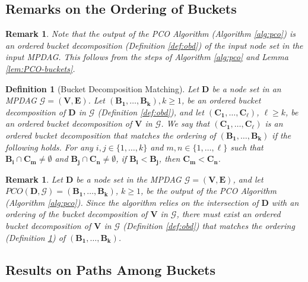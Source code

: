 \documentclass[11pt]{article}
\newtheorem{remark}[theorem]{Remark}
\newtheorem{definition}[theorem]{Definition}
\newcommand{\mb}[1]{\mathbf{#1}}
\newcommand{\g}[1][G]{\mathcal{#1}}
\begin{document}

\subsection{Remarks on the Ordering of Buckets}

\begin{remark} 
    Note that the output of the PCO Algorithm (Algorithm \ref{alg:pco}) is an ordered bucket decomposition (Definition \ref{def:obd}) of the input node set in the input MPDAG. This follows from the steps of Algorithm \ref{alg:pco} and Lemma \ref{lem:PCO-buckets}.
\end{remark}


\begin{definition}[Bucket Decomposition Matching]
\label{def:obd-matching}
    Let $\mb{D}$ be a node set in an MPDAG $\g=(\mb{V},\mb{E})$. Let $(\mb{B_1}, \dots, \mb{B_k}), k \ge 1$, be an ordered bucket decomposition of $\mb{D}$ in $\g$ (Definition \ref{def:obd}), and let $(\mb{C_1}, \dots, \mb{C_{\ell}})$, $\ell \ge k$, be an ordered bucket decomposition of $\mb{V}$ in $\g$. We say that $(\mb{C_1}, \dots, \mb{C_{\ell}})$ is an ordered bucket decomposition that \emph{matches the ordering} of $(\mb{B_1}, \dots, \mb{B_k})$ if the following holds. For any $i,j \in \{1, \dots, k \}$ and $m, n \in \{ 1, \dots, \ell \}$ such that $\mb{B_i} \cap \mb{C_m} \neq \emptyset$ and $\mb{B_j} \cap \mb{C_n} \neq \emptyset$, if $\mb{B_i} < \mb{B_j}$, then $\mb{C_m} < \mb{C_n}$.
\end{definition}


\begin{remark}
\label{rem:obd-matching}
    Let $\mb{D}$ be a node set in the MPDAG $\g = (\mb{V}, \mb{E})$, and let $PCO(\mb{D}, \g) =(\mb{B_1}, \dots, \mb{B_k})$, $k \ge 1$, be the output of the PCO Algorithm (Algorithm \ref{alg:pco}). Since the algorithm relies on the intersection of $\mb{D}$ with an ordering of the bucket decomposition of $\mb{V}$ in $\g$, there must exist an ordered bucket decomposition of $\mb{V}$ in $\g$ (Definition \ref{def:obd}) that matches the ordering (Definition \ref{def:obd-matching}) of $(\mb{B_1}, \dots, \mb{B_k})$.
\end{remark}






\subsection{Results on Paths Among Buckets}
\end{document}
